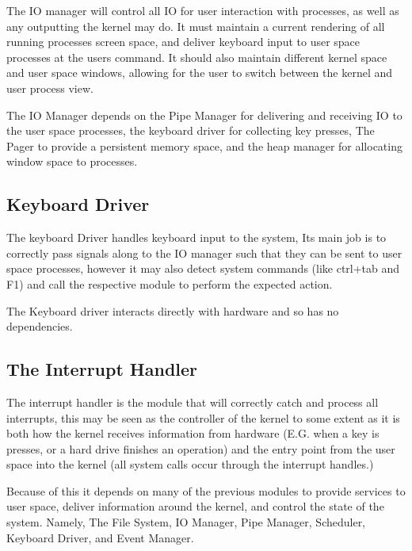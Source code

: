 \documentclass[a4paper]{report}
\begin{document}
The IO manager will control all IO for user interaction with processes, as well as any outputting the kernel may do. It must maintain a current rendering of all running processes screen space, and deliver keyboard input to user space processes at the users command. It should also maintain different kernel space and user space windows, allowing for the user to switch between the kernel and user process view.

The IO Manager depends on the Pipe Manager for delivering and receiving IO to the user space processes, the keyboard driver for collecting key presses, The Pager to provide a persistent memory space, and the heap manager for allocating window space to processes.

\subsection{Keyboard Driver}

The keyboard Driver handles keyboard input to the system, Its main job is to correctly pass signals along to the IO manager such that they can be sent to user space processes, however it may also detect system commands (like ctrl+tab and F1) and call the respective module to perform the expected action.

The Keyboard driver interacts directly with hardware and so has no dependencies.

\subsection{The Interrupt Handler}

The interrupt handler is the module that will correctly catch and process all interrupts, this may be seen as the controller of the kernel to some extent as it is both how the kernel receives information from hardware (E.G. when a key is presses, or a hard drive finishes an operation) and the entry point from the user space into the kernel (all system calls occur through the interrupt handles.)

Because of this it depends on many of the previous modules to provide services to user space, deliver information around the kernel, and control the state of the system. Namely, The File System, IO Manager, Pipe Manager, Scheduler, Keyboard Driver, and Event Manager.
\end{document}

